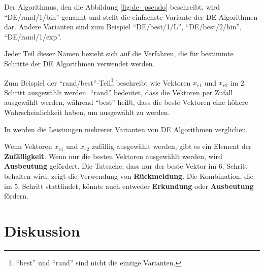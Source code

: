 \documentclass[twoside,twocolumn]{article}
\begin{document}
Der Algorithmus, den die Abbildung \ref{fig:de_pseudo} beschreibt, wird \enquote{DE/rand/1/bin} genannt und stellt die einfachste Variante der DE Algorithmen dar. Andere Varianten sind zum Beispiel \enquote{DE/best/1/L}, \enquote{DE/best/2/bin}, \enquote{DE/rand/1/exp}.\par
Jeder Teil dieser Namen bezieht sich auf die Verfahren, die für bestimmte Schritte der DE Algorithmen verwendet werden.\par
Zum Beispiel der \enquote{rand/best}-Teil\footnote{\enquote{best} und \enquote{rand} sind nicht die einzige Varianten.} beschreibt wie Vektoren $x_{r1}$ und $x_{r2}$ im 2. Schritt ausgewählt werden. \enquote{rand} bedeutet, dass die Vektoren per Zufall ausgewählt werden, während \enquote{best} heißt, dass die beste Vektoren eine höhere Wahrscheinlichkeit haben, um ausgewählt zu werden.\par
In \cite{love_u_mex} werden die Leistungen mehrerer Varianten von DE Algorithmen verglichen.\par
Wenn Vektoren $x_{r1}$ und $x_{r2}$ zufällig ausgewählt werden, gibt es ein Element der \textbf{Zufälligkeit}. Wenn nur die besten Vektoren ausgewählt werden, wird \textbf{Ausbeutung} gefördert. Die Tatsache, dass nur der beste Vektor im 6. Schritt behalten wird, zeigt die Verwendung von \textbf{Rückmeldung}. Die Kombination, die im 5. Schritt stattfindet, könnte auch entweder \textbf{Erkundung} oder \textbf{Ausbeutung} fördern.


\section{Diskussion}
\end{document}
